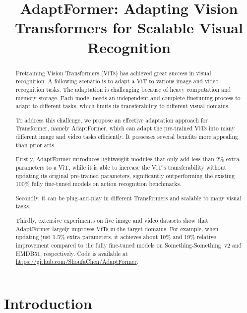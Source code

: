 \title{AdaptFormer: Adapting Vision Transformers for Scalable Visual Recognition}

\begin{abstract}
Pretraining Vision Transformers (ViTs) has achieved great success in visual recognition. A following scenario is to adapt a ViT to various image and video recognition tasks. The adaptation is challenging because of heavy computation and memory storage. Each model needs an independent and complete finetuning process to adapt to different tasks, which limits its transferability to different visual domains.

To address this challenge, we propose an effective adaptation approach for Transformer, namely AdaptFormer, which can adapt the pre-trained ViTs into many different image and video tasks efficiently. It possesses several benefits more appealing than prior arts.

Firstly, AdaptFormer introduces lightweight modules that only add less than 2\% extra parameters to a ViT, while it is able to increase the ViT's transferability without updating its original pre-trained parameters, significantly outperforming the existing 100\% fully fine-tuned models on action recognition benchmarks.

Secondly, it can be plug-and-play in different Transformers and scalable to many visual tasks.

Thirdly, extensive experiments on five image and video datasets show that AdaptFormer largely improves ViTs in the target domains. For example, when updating just 1.5\% extra parameters, it achieves about 10\% and 19\% relative improvement compared to the fully fine-tuned models on Something-Something~v2 and HMDB51, respectively. Code is available at \url{https://github.com/ShoufaChen/AdaptFormer}.
\end{abstract}

\section{Introduction}

